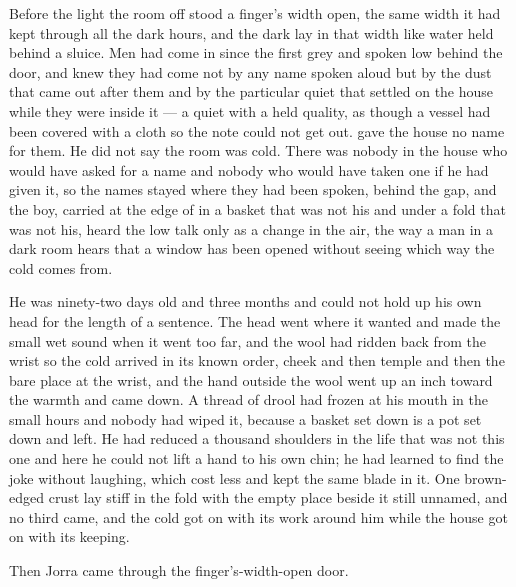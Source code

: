 
Before the light the room off  stood a finger's width open, the same width it had kept through all the dark hours, and the dark lay in that width like water held behind a sluice. Men had come in since the first grey and spoken low behind the door, and  knew they had come not by any name spoken aloud but by the dust that came out after them and by the particular quiet that settled on the house while they were inside it --- a quiet with a held quality, as though a vessel had been covered with a cloth so the note could not get out.  gave the house no name for them. He did not say the room was cold. There was nobody in the house who would have asked for a name and nobody who would have taken one if he had given it, so the names stayed where they had been spoken, behind the gap, and the boy, carried at the edge of  in a basket that was not his and under a fold that was not his, heard the low talk only as a change in the air, the way a man in a dark room hears that a window has been opened without seeing which way the cold comes from.

He was ninety-two days old and three months and could not hold up his own head for the length of a sentence. The head went where it wanted and made the small wet sound when it went too far, and the wool had ridden back from the wrist so the cold arrived in its known order, cheek and then temple and then the bare place at the wrist, and the hand outside the wool went up an inch toward the warmth and came down. A thread of drool had frozen at his mouth in the small hours and nobody had wiped it, because a basket set down is a pot set down and left. He had reduced a thousand shoulders in the life that was not this one and here he could not lift a hand to his own chin; he had learned to find the joke without laughing, which cost less and kept the same blade in it. One brown-edged crust lay stiff in the fold with the empty place beside it still unnamed, and no third came, and the cold got on with its work around him while the house got on with its keeping.

Then Jorra came through the finger's-width-open door.

